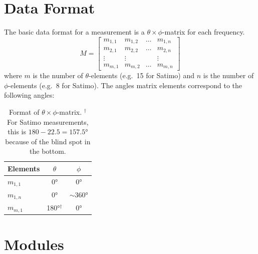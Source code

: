 \documentclass[10pt]{article}
\begin{document}
\section{Data Format}
The basic data format for a measurement is a $\theta \times \phi$-matrix for each frequency.
\begin{equation}
    M = \begin{bmatrix}
        m_{1,1} & m_{1,2} & \dots & m_{1,n} \\
        m_{2,1} & m_{2,2} & \dots & m_{2,n} \\
        \vdots & \vdots & & \vdots \\
        m_{m,1} & m_{m,2} & \dots & m_{m,n}
    \end{bmatrix}
\end{equation}
where $m$ is the number of $\theta$-elements (e.g.\ 15 for Satimo) and $n$ is the number of $\phi$-elements (e.g.\ 8 for Satimo). The angles matrix elements correspond to the following angles:
\begin{table}[htbp]
    \centering
    \begin{tabular}{|l|c|c|}
        \hline
        Elements & $\theta$ & $\phi$ \\
        \hline
        $m_{1,1}$ & \ang{0} & \ang{0} \\
        $m_{1,n}$ & \ang{0} & $\sim\ang{360}$ \\
        $m_{m,1}$ & \ang{180}$^{\dagger}$ & \ang{0} \\
        \hline
    \end{tabular}
    \caption{Format of $\theta\times\phi$-matrix. $^{\dagger}$For Satimo measurements, this is $180-22.5=\ang{157.5}$ because of the blind spot in the bottom.}
    \label{tab:matrixformat}
\end{table}

\section{Modules}


\clearpage
\end{document}
